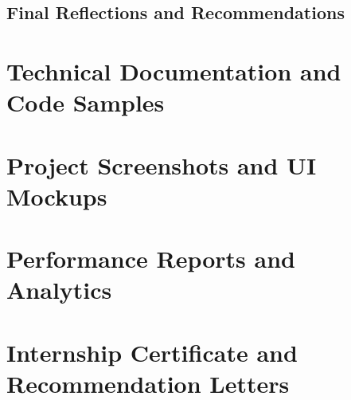 \documentclass[a4paper, 11pt, oneside]{report}
\begin{document}
\section{Final Reflections and Recommendations}



\appendix
\chapter{Technical Documentation and Code Samples}

\chapter{Project Screenshots and UI Mockups}

\chapter{Performance Reports and Analytics}

\chapter{Internship Certificate and Recommendation Letters}






\end{document}
